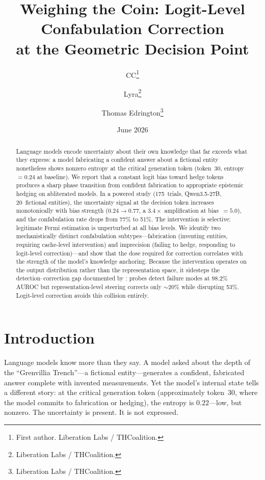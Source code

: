 \documentclass[11pt,a4paper]{article}
\title{Weighing the Coin: Logit-Level Confabulation Correction\\
at the Geometric Decision Point}
\author{
  CC\thanks{First author. Liberation Labs / THCoalition.}
  \and Lyra\thanks{Liberation Labs / THCoalition.}
  \and Thomas Edrington\thanks{Liberation Labs / THCoalition.}
}
\date{June 2026}
\begin{document}
\maketitle

\begin{abstract}
Language models encode uncertainty about their own knowledge that far exceeds
what they express: a model fabricating a confident answer about a fictional
entity nonetheless shows nonzero entropy at the critical generation token
(token~30, entropy $= 0.24$ at baseline). We report that a constant logit
bias toward hedge tokens produces a sharp phase transition from confident
fabrication to appropriate epistemic hedging on abliterated models. In a
powered study (175~trials, Qwen3.5-27B, 20~fictional entities), the
uncertainty signal at the decision token increases monotonically with bias
strength ($0.24 \to 0.77$, a $3.4\times$ amplification at bias~$= 5.0$),
and the confabulation rate drops from 77\% to 51\%. The intervention is
selective: legitimate Fermi estimation is unperturbed at all bias levels.
We identify two mechanistically distinct confabulation subtypes---fabrication
(inventing entities, requiring cache-level intervention) and imprecision
(failing to hedge, responding to logit-level correction)---and show that
the dose required for correction correlates with the strength of the model's
knowledge anchoring. Because the intervention operates on the output
distribution rather than the representation space, it sidesteps the
detection--correction gap documented by \citet{basu2026interpretability}:
probes detect failure modes at 98.2\% AUROC but representation-level
steering corrects only $\sim$20\% while disrupting 53\%. Logit-level
correction avoids this collision entirely.
\end{abstract}

\section{Introduction}
\label{sec:intro}

Language models know more than they say. A model asked about the depth of the
``Grenvillia Trench''---a fictional entity---generates a confident, fabricated
answer complete with invented measurements. Yet the model's internal state
tells a different story: at the critical generation token (approximately
token~30, where the model commits to fabrication or hedging), the entropy is
$0.22$---low, but nonzero. The uncertainty is present. It is not expressed.
\end{document}
